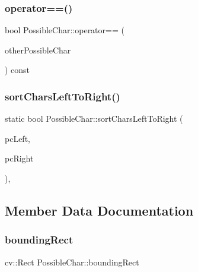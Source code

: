 \subsubsection{\texorpdfstring{operator==()}{operator==()}}
{\footnotesize\ttfamily bool Possible\+Char\+::operator== (\begin{DoxyParamCaption}\item[{const \hyperlink{class_possible_char}{Possible\+Char} \&}]{other\+Possible\+Char }\end{DoxyParamCaption}) const\hspace{0.3cm}{\ttfamily [inline]}}

\mbox{\label{class_possible_char_ade8559350ed9386989c3cf9ba4e61b0d}} 
\subsubsection{\texorpdfstring{sort\+Chars\+Left\+To\+Right()}{sortCharsLeftToRight()}}
{\footnotesize\ttfamily static bool Possible\+Char\+::sort\+Chars\+Left\+To\+Right (\begin{DoxyParamCaption}\item[{const \hyperlink{class_possible_char}{Possible\+Char} \&}]{pc\+Left,  }\item[{const \hyperlink{class_possible_char}{Possible\+Char} \&}]{pc\+Right }\end{DoxyParamCaption})\hspace{0.3cm}{\ttfamily [inline]}, {\ttfamily [static]}}



\subsection{Member Data Documentation}
\mbox{\label{class_possible_char_a9bcecfe6d2758c542c5963198599cb8f}} 
\subsubsection{\texorpdfstring{bounding\+Rect}{boundingRect}}
{\footnotesize\ttfamily cv\+::\+Rect Possible\+Char\+::bounding\+Rect}

